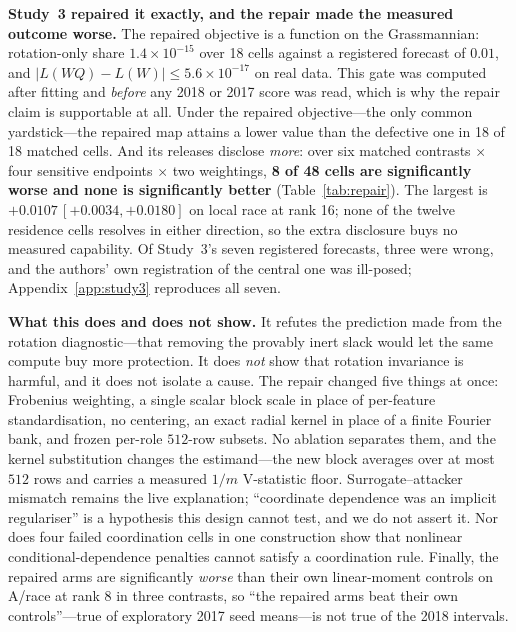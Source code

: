 \documentclass[10pt]{article}
\begin{document}
\begin{table}[t]
\centering\footnotesize

\caption{The repair worked on the objective and did not work on the release.
\noteRepairDiagnostic}
\label{tab:repair}
\end{table}

\textbf{Study~3 repaired it exactly, and the repair made the measured outcome worse.} The repaired
objective is a function on the Grassmannian: rotation-only share $1.4\times10^{-15}$ over 18 cells
against a registered forecast of $0.01$, and $|L(WQ)-L(W)|\le5.6\times10^{-17}$ on real data. This
gate was computed after fitting and \emph{before} any 2018 or 2017 score was read, which is why the
repair claim is supportable at all. Under the repaired objective---the only common yardstick---the
repaired map attains a lower value than the defective one in 18 of 18 matched cells. And its releases
disclose \emph{more}: over six matched contrasts $\times$ four sensitive endpoints $\times$ two
weightings, \textbf{8 of 48 cells are significantly worse and none is significantly better}
(Table~\ref{tab:repair}). The largest is $+0.0107\,[+0.0034,+0.0180]$ on local race at rank 16;
none of the twelve residence cells resolves in either direction, so the extra disclosure buys no
measured capability. Of Study~3's seven registered
forecasts, three were wrong, and the authors' own registration of the central one was ill-posed;
Appendix~\ref{app:study3} reproduces all seven.

\textbf{What this does and does not show.} It refutes the prediction made from the rotation
diagnostic---that removing the provably inert slack would let the same compute buy more protection.
It does \emph{not} show that rotation invariance is harmful, and it does not isolate a cause. The
repair changed five things at once: Frobenius weighting, a single scalar block scale in place of
per-feature standardisation, no centering, an exact radial kernel in place of a finite Fourier bank,
and frozen per-role $512$-row subsets. No ablation separates them, and the kernel substitution
changes the estimand---the new block averages over at most $512$ rows and carries a measured $1/m$
V-statistic floor. Surrogate--attacker mismatch remains the live explanation; ``coordinate dependence
was an implicit regulariser'' is a hypothesis this design cannot test, and we do not assert it.
Nor does four failed coordination cells in one construction show that nonlinear conditional-dependence
penalties cannot satisfy a coordination rule. Finally, the repaired arms are significantly
\emph{worse} than their own linear-moment controls on A/race at rank 8 in three contrasts, so ``the
repaired arms beat their own controls''---true of exploratory 2017 seed means---is not true of the
2018 intervals.
\end{document}
